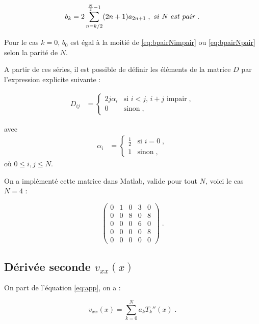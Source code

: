 \documentclass{report}
\begin{document}
\begin{equation}\label{eq:bpairNpair}
b_{k} = 2\sum_{n=k/2}^{\frac{N}{2}-1}(2n+1)a_{2n+1} \;, \\\\\ si \ N \ est \ pair\;.
\end{equation}

Pour le cas $k=0$, $b_{0}$ est égal à la moitié de \eqref{eq:bpairNimpair} ou \eqref{eq:bpairNpair} selon la parité de $N$.

A partir de ces séries, il est possible de définir les éléments de la matrice $D$ par l'expression explicite suivante :

\begin{align}
D_{ij} &= 
  \begin{cases}
    2j\alpha_{i} & \text{si $i<j$, $i+j$ impair}\;, \\
0 & \text{sinon}\;,
  \end{cases}
  \end{align}
  
  avec 
  \begin{align}
\alpha_{i} &= 
  \begin{cases}
    \frac{1}{2} & \text{si $i =0$}\;, \\
1 & \text{sinon}\;,
  \end{cases}
  \end{align}
où $0 \leq i,j \leq N$.



On a implémenté cette matrice dans Matlab, valide pour tout $N$, voici le cas $N=4$ :

\begin{equation}
\begin{pmatrix}
0 & 1 & 0 & 3 & 0\\ 
0 & 0 & 8 & 0 & 8\\ 
0 & 0 & 0 & 6 & 0\\ 
0 & 0 & 0 & 0 & 8\\ 
0 & 0 & 0 & 0 & 0
\end{pmatrix} \;.
\end{equation}

\subsection*{Dérivée seconde $v_{xx}(x)$}

On part de l'équation \eqref{eq:app}, on a :

\begin{equation}
v_{xx}(x) = \sum_{k=0}^N a_k T_{k}''(x)\;.\label{eq:vxxa}
\end{equation}
\end{document}
